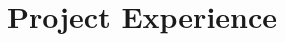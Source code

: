 \documentclass[a4paper]{deedy-resume-proximanova-sanfran} %
\begin{document}
\begin{minipage}[t]{0.66\textwidth}
\sectionspace %










\section{Project Experience}


\end{minipage}
\end{document}
